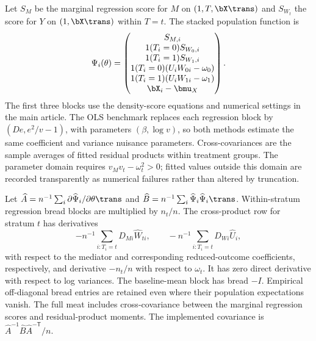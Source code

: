 Let $S_M$ be the marginal regression score for $M$ on $(1,T,\bX\trans)$ and $S_{W_t}$ the score for $Y$ on $(1,\bX\trans)$ within $T=t$. The stacked population function is
\[
\Psi_i(\theta)=\begin{pmatrix}
S_{M,i}\\
1(T_i=0)S_{W_0,i}\\
1(T_i=1)S_{W_1,i}\\
1(T_i=0)(U_iW_{0i}-\omega_0)\\
1(T_i=1)(U_iW_{1i}-\omega_1)\\
\bX_i-\bmu_X
\end{pmatrix}.
\]
The first three blocks use the density-score equations and numerical settings in the main article. The OLS benchmark replaces each regression block by $(D e, e^2/v-1)$, with parameters $(\beta,\log v)$, so both methods estimate the same coefficient and variance nuisance parameters. Cross-covariances are the sample averages of fitted residual products within treatment groups. The parameter domain requires $v_Mv_t-\omega_t^2>0$; fitted values outside this domain are recorded transparently as numerical failures rather than altered by truncation.

Let $\widehat A=n^{-1}\sum_i\partial\widehat\Psi_i/\partial\theta\trans$ and $\widehat B=n^{-1}\sum_i\widehat\Psi_i\widehat\Psi_i\trans$. Within-stratum regression bread blocks are multiplied by $n_t/n$. The cross-product row for stratum $t$ has derivatives
\[
-n^{-1}\sum_{i:T_i=t}D_{Mi}\widehat W_{ti},\qquad
-n^{-1}\sum_{i:T_i=t}D_{Wi}\widehat U_i,
\]
with respect to the mediator and corresponding reduced-outcome coefficients, respectively, and derivative $-n_t/n$ with respect to $\omega_t$. It has zero direct derivative with respect to log variances. The baseline-mean block has bread $-I$. Empirical off-diagonal bread entries are retained even where their population expectations vanish. The full meat includes cross-covariance between the marginal regression scores and residual-product moments. The implemented covariance is $\widehat A^{-1}\widehat B\widehat A^{-\mathsf T}/n$.

